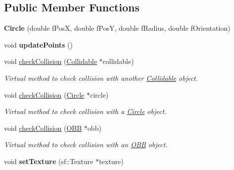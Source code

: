 \subsection*{Public Member Functions}
\begin{DoxyCompactItemize}
\item 
\hypertarget{class_circle_ac69dcf84ea92b1ea85880b15d83bcea5}{}{\bfseries Circle} (double f\+Pos\+X, double f\+Pos\+Y, double f\+Radius, double f\+Orientation)\label{class_circle_ac69dcf84ea92b1ea85880b15d83bcea5}

\item 
\hypertarget{class_circle_afe23c30a1bbc5e831b72063aef91b38f}{}void {\bfseries update\+Points} ()\label{class_circle_afe23c30a1bbc5e831b72063aef91b38f}

\item 
\hypertarget{class_circle_a7b23c1ed107b8a309fc1c5d0f6635ae9}{}void \hyperlink{class_circle_a7b23c1ed107b8a309fc1c5d0f6635ae9}{check\+Collision} (\hyperlink{class_collidable}{Collidable} $\ast$collidable)\label{class_circle_a7b23c1ed107b8a309fc1c5d0f6635ae9}

\begin{DoxyCompactList}\small\item\em Virtual method to check collision with another \hyperlink{class_collidable}{Collidable} object. \end{DoxyCompactList}\item 
\hypertarget{class_circle_ad528dfc586b5a46b11401abf52d8da87}{}void \hyperlink{class_circle_ad528dfc586b5a46b11401abf52d8da87}{check\+Collision} (\hyperlink{class_circle}{Circle} $\ast$circle)\label{class_circle_ad528dfc586b5a46b11401abf52d8da87}

\begin{DoxyCompactList}\small\item\em Virtual method to check collision with a \hyperlink{class_circle}{Circle} object. \end{DoxyCompactList}\item 
\hypertarget{class_circle_a328f1400d819209db7b64431b60bbc59}{}void \hyperlink{class_circle_a328f1400d819209db7b64431b60bbc59}{check\+Collision} (\hyperlink{class_o_b_b}{O\+B\+B} $\ast$obb)\label{class_circle_a328f1400d819209db7b64431b60bbc59}

\begin{DoxyCompactList}\small\item\em Virtual method to check collision with an \hyperlink{class_o_b_b}{O\+B\+B} object. \end{DoxyCompactList}\item 
\hypertarget{class_circle_ac6c48964ac829b4c1a15b313d9ae102a}{}void {\bfseries set\+Texture} (sf\+::\+Texture $\ast$texture)\label{class_circle_ac6c48964ac829b4c1a15b313d9ae102a}

\end{DoxyCompactItemize}
